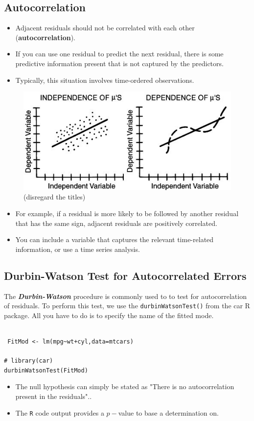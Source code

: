 \documentclass[residuals.tex]{subfiles}
\begin{document}
\subsection*{Autocorrelation} 
\begin{itemize}
\item Adjacent residuals should not be correlated with each other (\textbf{autocorrelation}). 
\item If you can use one residual to predict the next residual, there is some predictive information present that is not captured by the predictors. 
\item Typically, this situation involves time-ordered observations. 
\end{itemize}

\begin{figure}[h!]
\centering
\includegraphics[width=0.7\linewidth]{autocorrelation1}
\caption{(disregard the titles)}

\end{figure}
\begin{itemize}
\item For example, if a residual is more likely to be followed by another residual that has the same sign, adjacent residuals are positively correlated. 
\item You can include a variable that captures the relevant time-related information, or use a time series analysis.
\end{itemize}
 
\newpage
\subsection*{Durbin-Watson Test for Autocorrelated Errors}
The \textbf{\textit{Durbin-Watson} }procedure is commonly used to to test for autocorrelation of residuals. To perform this test, we use the \texttt{durbinWatsonTest()} from the car R package. All you have to do is to specify the name of the fitted mode.

\begin{framed}
\begin{verbatim}

 FitMod <- lm(mpg~wt+cyl,data=mtcars)

# library(car)
durbinWatsonTest(FitMod)

\end{verbatim}
\end{framed}
\begin{itemize}
\item The null hypothesis can simply be stated as "There is no autocorrelation present in the residuals".. 
\item The \texttt{R} code output provides a $p-$value to base a determination on.
\end{itemize}
\end{document}
